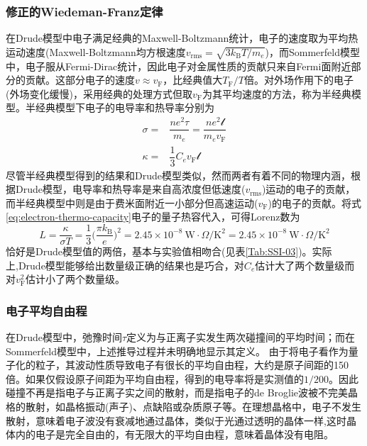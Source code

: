 \subsubsection{修正的Wiedeman-Franz定律} 
在Drude模型中电子满足经典的Maxwell-Boltzmann统计，电子的速度取为平均热运动速度(Maxwell-Boltzmann均方根速度$v_{\mathrm{rms}}=\sqrt{3k_{\mathrm{B}}T/m_e}$)，而Sommerfeld模型中，电子服从Fermi-Dirac统计，因此电子对金属性质的贡献只来自Fermi面附近部分的贡献。这部分电子的速度$v\approx v_{\mathrm{F}}$，比经典值大$T_{\mathrm{F}}/T$倍。对外场作用下的电子(外场变化缓慢)，采用经典的处理方式但取$v_{\mathrm{F}}$为其平均速度的方法，称为半经典模型。半经典模型下电子的电导率和热导率分别为
\begin{equation}
	\begin{aligned}
		\sigma=&\dfrac{ne^2\tau}{m_e}=\dfrac{ne^2\mathscr{l}}{m_ev_{\mathrm{F}}}\\
		\kappa=&\dfrac13C_ev_{\mathrm{F}}\mathscr{l}
	\end{aligned}
	\label{eq:electron-thermo_conduct}
\end{equation}
尽管半经典模型得到的结果和Drude模型类似，然而两者有着不同的物理内涵，根据Drude模型，电导率和热导率是来自高浓度但低速度($v_{\mathrm{rms}}$)运动的电子的贡献，而半经典模型中则是由于费米面附近一小部分但高速运动($v_{\mathrm{F}}$)的电子的贡献。将式\eqref{eq:electron-thermo-capacity}电子的量子热容代入，可得Lorenz数为
\begin{equation}
	L=\dfrac{\kappa}{\sigma T}=\dfrac13\bigg(\dfrac{\pi k_{\mathrm{B}}}e\bigg)^2=2.45\times10^{-8}~\mathrm{W}\cdot\Omega/\mathrm{K}^2=2.45\times10^{-8}~\mathrm{W}\cdot\Omega/\mathrm{K}^2
	\label{eq:Lorenz-num}
\end{equation}
恰好是Drude模型值的两倍，基本与实验值相吻合(见表\ref{Tab:SSI-03})。实际上,Drude模型能够给出数量级正确的结果也是巧合，对$C_e$估计大了两个数量级而对$v_{\mathrm{F}}^2$估计小了两个数量级。

\subsubsection{电子平均自由程}
在Drude模型中，弛豫时间$\tau$定义为与正离子实发生两次碰撞间的平均时间；而在Sommerfeld模型中，上述推导过程并未明确地显示其定义。%
由于将电子看作为量子化的粒子，其波动性质导致电子有很长的平均自由程，大约是原子间距的150倍。如果仅假设原子间距为平均自由程，得到的电导率将是实测值的$1/200$。因此碰撞不再是指电子与正离子实之间的散射，而是指电子的de Broglie波被不完美晶格的散射，如晶格振动(声子)、点缺陷或杂质原子等。在理想晶格中，电子不发生散射，意味着电子波没有衰减地通过晶体，类似于光通过透明的晶体一样,这时晶体内的电子是完全自由的，有无限大的平均自由程，意味着晶体没有电阻。

